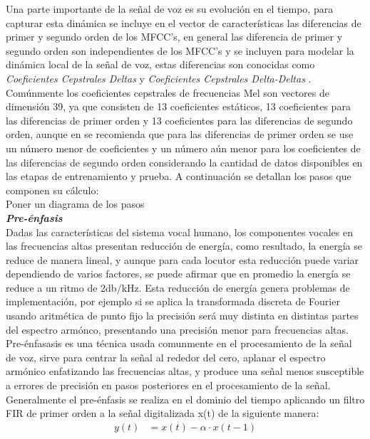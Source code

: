 Una parte importante de la señal de voz es su evoluci\'on en el tiempo, para capturar esta din\'amica se incluye en el vector de caracter\'isticas las diferencias de primer y segundo orden de los MFCC's, en general las diferencia de primer y segundo orden son independientes de los MFCC's y se incluyen para modelar la din\'amica local de la señal de voz, estas diferencias son conocidas como \textit{Coeficientes Cepstrales Deltas} y \textit{Coeficientes Cepstrales Delta-Deltas} \cite{beigi2011}.\\

Com\'unmente los coeficientes cepstrales de frecuencias Mel son vectores de dimensi\'on 39, ya que consisten de 13 coeficientes est\'aticos, 13 coeficientes para las diferencias de primer orden y 13 coeficientes para las diferencias de segundo orden, aunque en \cite{beigi2011} se recomienda que para las diferencias de primer orden se use un n\'umero menor de coeficientes y un n\'umero a\'un menor para los coeficientes de las diferencias de segundo orden considerando la cantidad de datos disponibles en las etapas de entrenamiento y prueba. A continuaci\'on se detallan los pasos que componen su c\'alculo:\\

Poner un diagrama de los pasos\\

\noindent
\textbf{\textit{Pre-\'enfasis}}\\
\indent
Dadas las caracter\'isticas del sistema vocal humano, los componentes vocales en las frecuencias altas presentan reducci\'on de energ\'ia, como resultado, la energ\'ia se reduce de manera lineal, y aunque para cada locutor esta reducci\'on puede variar dependiendo de varios factores, se puede afirmar que en promedio la energ\'ia se reduce a un ritmo de 2db/kHz. Esta reducci\'on de energ\'ia genera problemas de implementaci\'on, por ejemplo si se aplica la transformada discreta de Fourier usando aritm\'etica de punto fijo la precisi\'on ser\'a muy distinta en distintas partes del espectro arm\'onco, presentando una precisi\'on menor para frecuencias altas.\\

Pre-\'enfasasis es una t\'ecnica usada comunmente en el procesamiento de la señal de voz, sirve para centrar la señal al rededor del cero, aplanar el espectro arm\'onico enfatizando las frecuencias altas, y produce una señal menos susceptible a errores de precisi\'on en pasos posteriores en el procesamiento de la señal. Generalmente el pre-\'enfasis se realiza en el dominio del tiempo aplicando un filtro FIR de primer orden a la señal digitalizada x(t) de la siguiente manera:
\begin{align}
   y(t) &= x(t) - \alpha \cdot x(t - 1)
\end{align}

